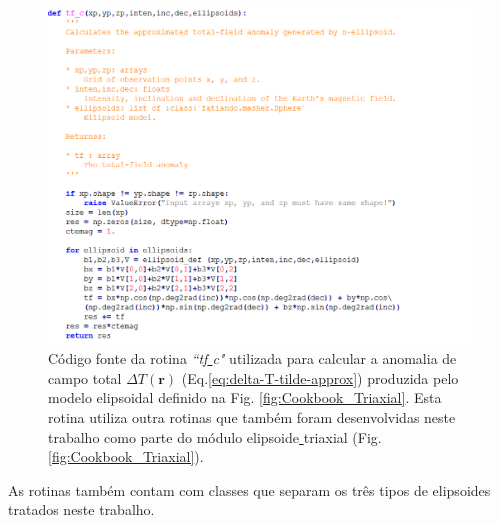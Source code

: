 \begin{figure}[hbt!]
	\centering \includegraphics[width=16 cm,height=16 cm]{figures/func_triaxial}
	\caption[Código fonte da rotina \textit{``tf\underline{ }c"} utilizada para calcular a anomalia de campo total $\Delta T (\mathbf{r})$ (Eq.\ref{eq:delta-T-tilde-approx}) produzida pelo modelo elipsoidal definido na Fig. \ref{fig:Cookbook_Triaxial}. Esta rotina utiliza outra rotinas que também foram desenvolvidas neste trabalho como parte do módulo elipsoide\underline{ }triaxial (Fig. \ref{fig:Cookbook_Triaxial}).]{Código fonte da rotina \textit{``tf\underline{ }c"} utilizada para calcular a anomalia de campo total $\Delta T (\mathbf{r})$ (Eq.\ref{eq:delta-T-tilde-approx}) produzida pelo modelo elipsoidal definido na Fig. \ref{fig:Cookbook_Triaxial}. Esta rotina utiliza outra rotinas que também foram desenvolvidas neste trabalho como parte do módulo elipsoide\underline{ }triaxial (Fig. \ref{fig:Cookbook_Triaxial}).}
	\label{fig:func_triaxial}
\end{figure}

As rotinas também contam com classes que separam os três tipos de elipsoides tratados neste trabalho.

